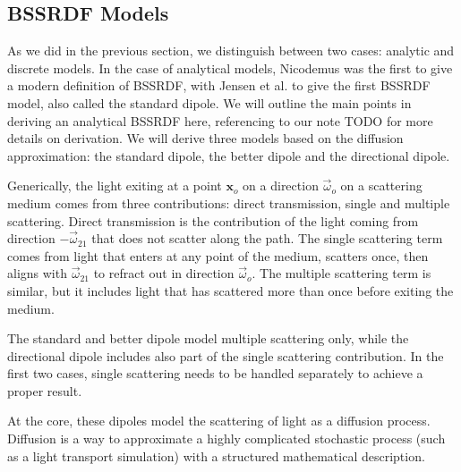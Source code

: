 \subsection{BSSRDF Models}
As we did in the previous section, we distinguish between two cases: analytic and discrete models. In the case of analytical models, Nicodemus was the first to give a modern definition of BSSRDF, with Jensen et al. to give the first BSSRDF model, also called the standard dipole. We will outline the main points in deriving an analytical BSSRDF here, referencing to our note TODO for more details on derivation. We will derive three models based on the diffusion approximation: the standard dipole, the better dipole and the directional dipole.

Generically, the light exiting at a point $\mathbf{x}_o$ on a direction $\vec{\omega}_o$ on a scattering medium comes from three contributions: direct transmission, single and multiple scattering. Direct transmission is the contribution of the light coming from direction $-\vec{\omega}_{21}$ that does not scatter along the path. The single scattering term comes from light that enters at any point of the medium, scatters once, then aligns with $\vec{\omega}_{21}$ to refract out in direction $\vec{\omega}_o$. The multiple scattering term is similar, but it includes light that has scattered more than once before exiting the medium. 

The standard and better dipole model multiple scattering only, while the directional dipole includes also part of the single scattering contribution. In the first two cases, single scattering needs to be handled separately to achieve a proper result. 

At the core, these dipoles model the scattering of light as a diffusion process. Diffusion is a way to approximate a highly complicated stochastic process (such as a light transport simulation) with a structured mathematical description. 

